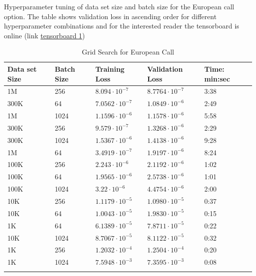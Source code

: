 \begin{table}[th]
\caption{Grid Search for European Call}{Hyperparameter tuning of data set size and batch size for the European call option. The table shows validation loss in ascending order for different hyperparameter combinations and for the interested reader the tensorboard is online (link \href{https://tensorboard.dev/experiment/8pxUoSDmTVGMOxpJWgiZsA/}{tensorboard 1})}
\label{tab:hyperEuroC1}
\centering
\begin{tabular}{lllll}
\toprule
\textbf{Data set Size} & \textbf{Batch Size} & \textbf{Training Loss} & \textbf{Validation Loss} & \textbf{Time: min:sec}\\
\midrule
1M    & 256   & $8.094\cdot 10^{-7}$ & $8.7764\cdot 10^{-7}$ & 3:38 \\ 
300K  & 64    & $7.0562\cdot 10^{-7}$ & $1.0849\cdot 10^{-6}$ & 2:49 \\ 
1M    & 1024  & $1.1596\cdot 10^{-6}$ & $1.1578\cdot 10^{-6}$ & 5:58 \\ 
300K  & 256   & $9.579\cdot 10^{-7}$ & $1.3268\cdot 10^{-6}$ & 2:29 \\ 
300K  & 1024  & $1.5367\cdot 10^{-6}$ & $1.4138\cdot 10^{-6}$ & 9:28 \\ 
1M   & 64    & $3.4919\cdot 10^{-7}$ & $1.9197\cdot 10^{-6}$ & 8:24\\ 
100K  & 256   & $2.243\cdot 10^{-6}$ & $2.1192\cdot 10^{-6}$ & 1:02  \\ 
100K  & 64    & $1.9565\cdot 10^{-6}$ & $2.5738\cdot 10^{-6}$ & 1:01 \\ 
100K  & 1024  & $3.22\cdot 10^{-6}$ & $4.4754\cdot 10^{-6}$ & 2:00\\ 
10K  & 256   & $1.1179\cdot 10^{-5}$ & $1.0980\cdot 10^{-5}$ & 0:37 \\ 
10K   & 64    & $1.0043\cdot 10^{-5}$ & $1.9830\cdot 10^{-5}$ & 0:15 \\ 
1K   & 64    & $6.1389\cdot 10^{-5}$ & $7.8711\cdot 10^{-5}$ & 0:22\\ 
10K   & 1024 & $8.7067\cdot 10^{-5}$ & $8.1122\cdot 10^{-5}$ & 0:32  \\ 
1K   & 256   & $1.2032\cdot 10^{-4}$ & $1.2504\cdot 10^{-4}$ & 0:20    \\ 
1K    & 1024  & $7.5948\cdot 10^{-3}$ & $7.3595\cdot 10^{-3}$ & 0:08    \\ 
\bottomrule\\
\end{tabular}
\end{table}

